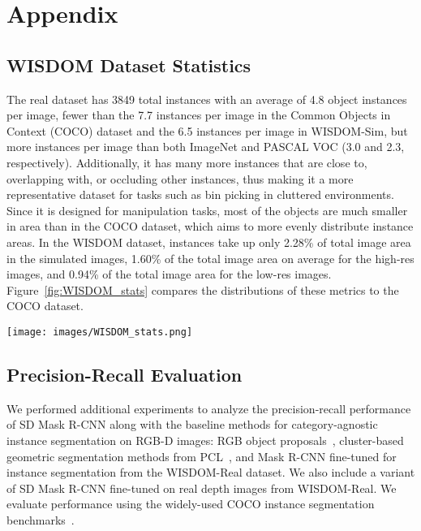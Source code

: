 \documentclass[letterpaper, 10 pt, conference]{ieeeconf}  \pdfoutput=1
\numberwithin{equation}{section}
\begin{document}
\appendix
\section{Appendix}

\subsection{WISDOM Dataset Statistics}
The real dataset has 3849 total instances with an average of 4.8 object instances per image, fewer than the 7.7 instances per image in the Common Objects in Context (COCO) dataset and the 6.5 instances per image in WISDOM-Sim, but more instances per image than both ImageNet and PASCAL VOC (3.0 and 2.3, respectively). Additionally, it has many more instances that are close to, overlapping with, or occluding other instances, thus making it a more representative dataset for tasks such as bin picking in cluttered environments. Since it is designed for manipulation tasks, most of the objects are much smaller in area than in the COCO dataset, which aims to more evenly distribute instance areas. In the WISDOM dataset, instances take up only 2.28\% of total image area in the simulated images, 1.60\% of the total image area on average for the high-res images, and 0.94\% of the total image area for the low-res images. Figure~\ref{fig:WISDOM_stats} compares the distributions of these metrics to the COCO dataset.

\begin{figure*}[t!]
    \centering
    \texttt{[image: images/WISDOM\_stats.png]}
    \caption{Distributions of the instances per image and instance size for the WISDOM dataset, with comparisons to the COCO dataset. Average number of instances are listed in parentheses next to each dataset. The number of instances and relative object size make this dataset more applicable to manipulation tasks.}
  \label{fig:WISDOM_stats}
\end{figure*}

\subsection{Precision-Recall Evaluation}
We performed additional experiments to analyze the precision-recall performance of SD Mask R-CNN along with the baseline methods for category-agnostic instance segmentation on RGB-D images: RGB object proposals~\cite{arbelaez2014multiscale, krahenbuhl2014geodesic}, cluster-based geometric segmentation methods from PCL~\cite{rusu20113d}, and Mask R-CNN fine-tuned for instance segmentation from the WISDOM-Real dataset.
We also include a variant of SD Mask R-CNN fine-tuned on real depth images from WISDOM-Real.
We evaluate performance using the widely-used COCO instance segmentation benchmarks~\cite{lin2014microsoft}.
\end{document}
